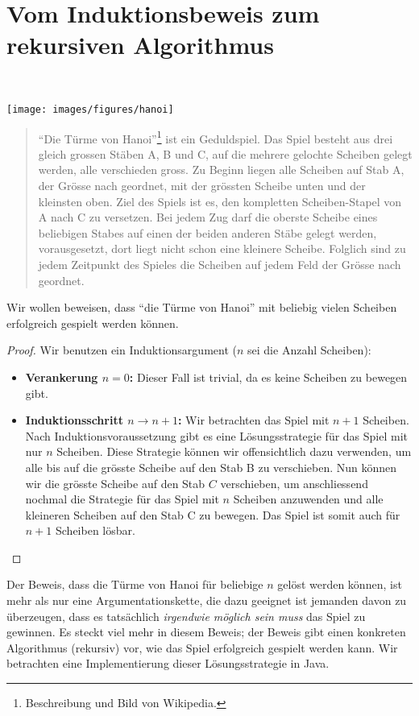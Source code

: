 \section{Vom Induktionsbeweis zum rekursiven Algorithmus}

\begin{example}~
\begin{center}
\texttt{[image: images/figures/hanoi]}
\end{center}
\begin{quote}
``Die Türme von Hanoi''\footnote{Beschreibung und Bild von Wikipedia.} ist ein Geduldspiel. Das Spiel besteht aus drei gleich grossen Stäben A, B und C, auf die mehrere gelochte Scheiben gelegt werden, alle verschieden gross. Zu Beginn liegen alle Scheiben auf Stab A, der Grösse nach geordnet, mit der grössten Scheibe unten und der kleinsten oben. Ziel des Spiels ist es, den kompletten Scheiben-Stapel von A nach C zu versetzen.
Bei jedem Zug darf die oberste Scheibe eines beliebigen Stabes auf einen der beiden anderen Stäbe gelegt werden, vorausgesetzt, dort liegt nicht schon eine kleinere Scheibe. Folglich sind zu jedem Zeitpunkt des Spieles die Scheiben auf jedem Feld der Grösse nach geordnet.
\end{quote}
Wir wollen beweisen, dass ``die Türme von Hanoi'' mit beliebig vielen Scheiben erfolgreich gespielt werden können.
\begin{proof} Wir benutzen ein Induktionsargument ($n$ sei die Anzahl Scheiben):
\begin{itemize}
\item \textbf{Verankerung $n=0$:} Dieser Fall ist trivial, da es keine Scheiben zu bewegen gibt.
\item \textbf{Induktionsschritt $n\to n+1$:} Wir betrachten das Spiel mit $n+1$ Scheiben. Nach Induktionsvoraussetzung gibt es eine Lösungsstrategie für das Spiel mit nur $n$ Scheiben. Diese Strategie können wir offensichtlich dazu verwenden, um alle bis auf die grösste Scheibe auf den Stab B zu verschieben. Nun können wir die grösste Scheibe auf den Stab $C$ verschieben, um anschliessend nochmal die Strategie für das Spiel mit $n$ Scheiben anzuwenden und alle kleineren Scheiben auf den Stab C zu bewegen. Das Spiel ist somit auch für $n+1$ Scheiben lösbar. \qedhere
\end{itemize}
\end{proof}
\begin{remark}
Der Beweis, dass die Türme von Hanoi für beliebige $n$ gelöst werden können, ist mehr als nur eine Argumentationskette, die dazu geeignet ist jemanden davon zu überzeugen, dass es tatsächlich \textit{irgendwie möglich sein muss} das Spiel zu gewinnen. Es steckt viel mehr in diesem Beweis; der Beweis gibt einen konkreten Algorithmus (rekursiv) vor, wie das Spiel erfolgreich gespielt werden kann. Wir betrachten eine Implementierung dieser Lösungsstrategie in Java.



\end{remark}
\end{example}
